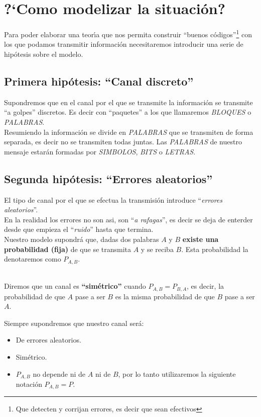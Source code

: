 \section{?`Como modelizar la situaci\'on?}

Para poder elaborar una teor\'{\i}a que nos permita construir ``buenos
c\'odigos''\footnote{Que detecten y corrijan errores, es decir que sean
efectivos} con los que podamos transmitir informaci\'on necesitaremos
introducir una serie de hip\'otesis sobre el modelo.

\subsection{Primera hip\'otesis: ``Canal discreto''}\label{sec:CanalDiscreto}

Supondremos que en el canal por el que se transmite la informaci\'on se
transmite ``a golpes'' discretos. Es decir con ``paquetes'' a los que 
llamaremos \emph{BLOQUES} o \emph{PALABRAS}.\\

Resumiendo la informaci\'on se divide en \emph{PALABRAS} que se transmiten de
forma separada, es decir no se transmiten todas juntas. Las \emph{PALABRAS} de
nuestro mensaje estar\'an formadas por \emph{SIMBOLOS}, \emph{BITS} o
\emph{LETRAS}.

\subsection{Segunda hip\'otesis: ``Errores aleatorios''}\label{sec:ErrorAleato}

El tipo de canal por el que se efectua la transmisi\'on introduce
``\emph{errores aleatorios}''.\\

En la realidad los errores no son asi, son ``\emph{a rafagas}'', es decir se
deja de enterder desde que empieza el ``\emph{ruido}'' hasta que termina.\\

Nuestro modelo supondr\'a que, dadas dos palabras $A$ y $B$ \textbf{existe una
probabilidad (fija)} de que se transmita $A$ y se reciba $B$. Esta probabilidad
la denotaremos como $P_{A,B}$.
\begin{definicion}
\ \\
Diremos que un canal es \textbf{``sim\'etrico''} cuando $P_{A,B}=P_{B,A}$, es
decir, la probabilidad de que $A$ pase a ser $B$ es la misma probabilidad de
que $B$ pase a ser $A$.
\end{definicion}
%
\newpage
%
Siempre supondremos que nuestro canal ser\'a:
\begin{itemize}
\item De errores aleatorios.
\item Sim\'etrico.
\item $P_{A,B}$ no depende ni de $A$ ni de $B$, por lo tanto utilizaremos la
siguiente notaci\'on $P_{A,B}=P$.
\end{itemize}

